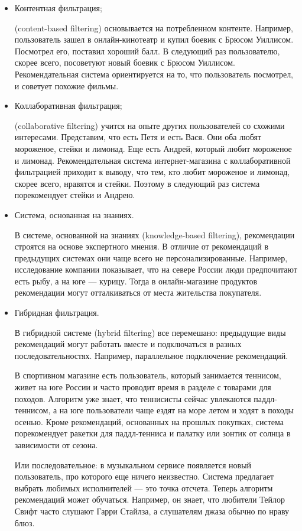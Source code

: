 \begin{itemize}
    \item Контентная фильтрация; \par
    (content-based filtering) основывается на потребленном контенте.
    Например, пользователь зашел в онлайн-кинотеатр и купил боевик с Брюсом Уиллисом.
    Посмотрел его, поставил хороший балл.
    В следующий раз пользователю, скорее всего, посоветуют новый боевик с Брюсом Уиллисом.
    Рекомендательная система ориентируется на то, что пользователь посмотрел, и советует похожие фильмы.

    \item Коллаборативная фильтрация; \par
(collaborative filtering) учится на опыте других пользователей со схожими интересами.
    Представим, что есть Петя и есть Вася.
    Они оба любят мороженое, стейки и лимонад.
    Еще есть Андрей, который любит мороженое и лимонад.
    Рекомендательная система интернет-магазина с коллаборативной фильтрацией приходит к выводу, что тем, кто любит
    мороженое и лимонад, скорее всего, нравятся и стейки.
    Поэтому в следующий раз система порекомендует стейки и Андрею.
    \item Система, основанная на знаниях. \par
    В системе, основанной на знаниях (knowledge-based filtering), рекомендации строятся на основе экспертного мнения.
    В отличие от рекомендаций в предыдущих системах они чаще всего не персонализированные.
    Например, исследование компании показывает, что на севере России люди предпочитают есть рыбу, а на юге — курицу.
    Тогда в онлайн-магазине продуктов рекомендации могут отталкиваться от места жительства покупателя.
    \item Гибридная фильтрация. \par
    В гибридной системе (hybrid filtering) все перемешано: предыдущие виды рекомендаций могут работать вместе и
    подключаться в разных последовательностях.
    Например, параллельное подключение рекомендаций. \par
    В спортивном магазине есть пользователь, который занимается теннисом, живет на юге России и часто проводит время в
    разделе с товарами для походов.
    Алгоритм уже знает, что теннисисты сейчас увлекаются паддл-теннисом, а на юге пользователи чаще ездят на море летом
    и ходят в походы осенью.
    Кроме рекомендаций, основанных на прошлых покупках, система порекомендует ракетки для паддл-тенниса и палатку или
    зонтик от солнца в зависимости от сезона. \par
    Или последовательное: в музыкальном сервисе появляется новый пользователь, про которого еще ничего неизвестно.
    Система предлагает выбрать любимых исполнителей — это точка отсчета.
    Теперь алгоритм рекомендаций может обучаться.
    Например, он знает, что любители Тейлор Свифт часто слушают Гарри Стайлза, а слушателям джаза обычно по нраву блюз.
\end{itemize}


